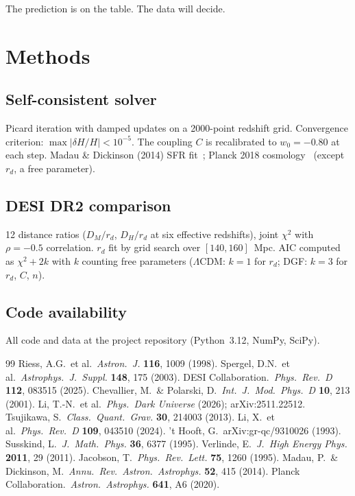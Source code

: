 \documentclass[12pt,a4paper]{article}
\begin{document}
The prediction is on the table. The data will decide.

\section*{Methods}

\subsection*{Self-consistent solver}
Picard iteration with damped updates on a 2000-point redshift grid. Convergence criterion: $\max|\delta H/H|<10^{-5}$. The coupling $C$ is recalibrated to $w_0=-0.80$ at each step. Madau \& Dickinson (2014) SFR fit~\cite{madau2014}; Planck 2018 cosmology~\cite{planck2018} (except $r_d$, a free parameter).

\subsection*{DESI DR2 comparison}
12 distance ratios ($D_M/r_d$, $D_H/r_d$ at six effective redshifts), joint $\chi^2$ with $\rho=-0.5$ correlation. $r_d$ fit by grid search over $[140,160]$~Mpc. AIC computed as $\chi^2+2k$ with $k$ counting free parameters ($\Lambda$CDM: $k=1$ for $r_d$; DGF: $k=3$ for $r_d$, $C$, $n$).

\subsection*{Code availability}
All code and data at the project repository (Python~3.12, NumPy, SciPy).

\begin{thebibliography}{99}
 Riess, A.G.\ et al.\ {\it Astron.\ J.} {\bf 116}, 1009 (1998).
 Spergel, D.N.\ et al.\ {\it Astrophys.\ J.\ Suppl.} {\bf 148}, 175 (2003).
 DESI Collaboration.\ {\it Phys.\ Rev.\ D} {\bf 112}, 083515 (2025).
 Chevallier, M.\ \& Polarski, D.\ {\it Int.\ J.\ Mod.\ Phys.\ D} {\bf 10}, 213 (2001).
 Li, T.-N.\ et al.\ {\it Phys.\ Dark Universe} (2026); arXiv:2511.22512.
 Tsujikawa, S.\ {\it Class.\ Quant.\ Grav.} {\bf 30}, 214003 (2013).
 Li, X.\ et al.\ {\it Phys.\ Rev.\ D} {\bf 109}, 043510 (2024).
 't Hooft, G.\ arXiv:gr-qc/9310026 (1993).
 Susskind, L.\ {\it J.\ Math.\ Phys.} {\bf 36}, 6377 (1995).
 Verlinde, E.\ {\it J.\ High Energy Phys.} {\bf 2011}, 29 (2011).
 Jacobson, T.\ {\it Phys.\ Rev.\ Lett.} {\bf 75}, 1260 (1995).
 Madau, P.\ \& Dickinson, M.\ {\it Annu.\ Rev.\ Astron.\ Astrophys.} {\bf 52}, 415 (2014).
 Planck Collaboration.\ {\it Astron.\ Astrophys.} {\bf 641}, A6 (2020).
\end{thebibliography}
\end{document}
